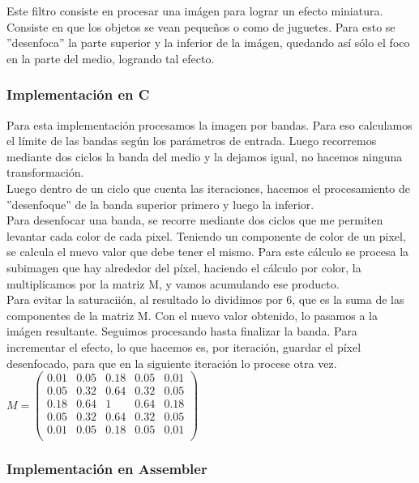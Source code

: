 Este filtro consiste en procesar una im\'agen para lograr un efecto miniatura. Consiste en que los objetos se vean pequeños o como de juguetes. Para esto se ''desenfoca'' la parte superior y la inferior de la im\'agen, quedando as\'i s\'olo el foco en la parte del medio, logrando tal efecto.


\subsubsection{Implementación en C}
Para esta implementaci\'on procesamos la imagen por bandas.
Para eso calculamos el límite de las bandas seg\'un los par\'ametros de entrada. Luego recorremos mediante dos ciclos la banda del medio y la dejamos igual, no hacemos ninguna transformaci\'on.\\
Luego dentro de un ciclo que cuenta las iteraciones, hacemos el procesamiento de ''desenfoque'' de la banda superior primero y luego la inferior.\\
Para desenfocar una banda, se recorre mediante dos ciclos que me permiten levantar cada color de cada pixel. Teniendo un componente de color de un pixel, se calcula el nuevo valor que debe tener el mismo. Para este c\'alculo se procesa la subimagen que hay alrededor del píxel, haciendo el c\'alculo por color, la multiplicamos por la matriz M, y vamos acumulando ese producto.\\
Para evitar la saturacii\'on, al resultado lo dividimos por 6, que es la suma de las componentes de la matriz M. Con el nuevo valor obtenido, lo pasamos a la im\'agen resultante. Seguimos procesando hasta finalizar la banda.
Para incrementar el efecto, lo que hacemos es, por iteraci\'on, guardar el p\'ixel desenfocado, para que en la siguiente iteración lo procese otra vez.\\

$M = \begin{pmatrix}
  0.01 & 0.05 & 0.18 & 0.05 & 0.01 \\
  0.05 & 0.32 & 0.64 & 0.32 & 0.05 \\
  0.18 & 0.64 & 1 & 0.64 & 0.18 \\
  0.05 & 0.32 & 0.64 & 0.32 & 0.05 \\
  0.01 & 0.05 & 0.18 & 0.05 & 0.01 \\
 \end{pmatrix}$

\subsubsection{Implementación en Assembler}


